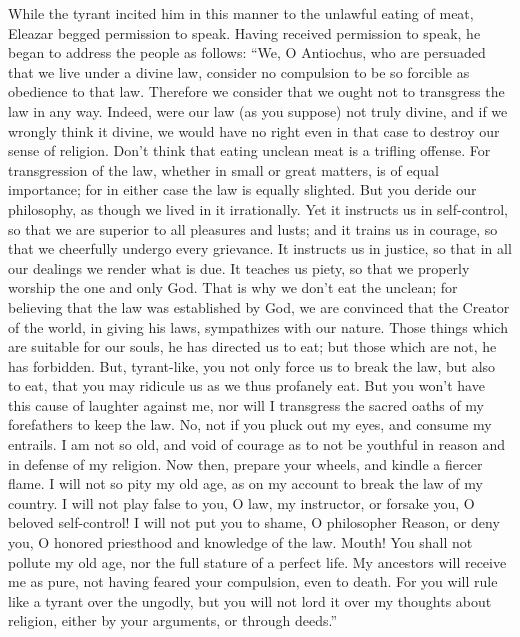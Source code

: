  While the tyrant incited him in this manner to the
unlawful eating of meat, Eleazar begged permission to speak.
 Having received permission to speak, he began to address
the people as follows:  ``We, O Antiochus, who are
persuaded that we live under a divine law, consider no compulsion to be
so forcible as obedience to that law.  Therefore we
consider that we ought not to transgress the law in any way.
 Indeed, were our law (as you suppose) not truly divine,
and if we wrongly think it divine, we would have no right even in that
case to destroy our sense of religion.  Don't think that
eating unclean meat is a trifling offense.  For
transgression of the law, whether in small or great matters, is of equal
importance;  for in either case the law is equally
slighted.  But you deride our philosophy, as though we
lived in it irrationally.  Yet it instructs us in
self-control, so that we are superior to all pleasures and lusts; and it
trains us in courage, so that we cheerfully undergo every grievance.
 It instructs us in justice, so that in all our dealings we
render what is due. It teaches us piety, so that we properly worship the
one and only God.  That is why we don't eat the unclean;
for believing that the law was established by God, we are convinced that
the Creator of the world, in giving his laws, sympathizes with our
nature.  Those things which are suitable for our souls, he
has directed us to eat; but those which are not, he has forbidden.
 But, tyrant-like, you not only force us to break the law,
but also to eat, that you may ridicule us as we thus profanely eat.
 But you won't have this cause of laughter against me,
 nor will I transgress the sacred oaths of my forefathers
to keep the law.  No, not if you pluck out my eyes, and
consume my entrails.  I am not so old, and void of courage
as to not be youthful in reason and in defense of my religion.
 Now then, prepare your wheels, and kindle a fiercer flame.
 I will not so pity my old age, as on my account to break
the law of my country.  I will not play false to you, O
law, my instructor, or forsake you, O beloved self-control!
 I will not put you to shame, O philosopher Reason, or deny
you, O honored priesthood and knowledge of the law.  Mouth!
You shall not pollute my old age, nor the full stature of a perfect
life.  My ancestors will receive me as pure, not having
feared your compulsion, even to death.  For you will rule
like a tyrant over the ungodly, but you will not lord it over my
thoughts about religion, either by your arguments, or through deeds.''

